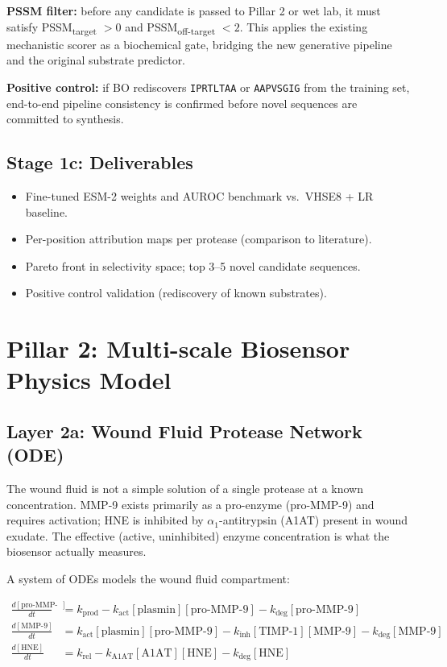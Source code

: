 \documentclass[10pt,a4paper]{article}
\newcommand{\seq}[1]{\texttt{#1}}
\begin{document}
\textbf{PSSM filter:} before any candidate is passed to Pillar 2 or wet
lab, it must satisfy PSSM\textsubscript{target} $>0$ and
PSSM\textsubscript{off-target} $<2$.  This applies the existing
mechanistic scorer as a biochemical gate, bridging the new generative
pipeline and the original substrate predictor.

\textbf{Positive control:} if BO rediscovers \seq{IPRTLTAA} or
\seq{AAPVSGIG} from the training set, end-to-end pipeline consistency
is confirmed before novel sequences are committed to synthesis.

\subsection{Stage 1c: Deliverables}

\begin{itemize}[topsep=2pt,itemsep=1pt,leftmargin=*]
  \item Fine-tuned ESM-2 weights and AUROC benchmark vs.\ VHSE8 + LR baseline.
  \item Per-position attribution maps per protease (comparison to literature).
  \item Pareto front in selectivity space; top 3--5 novel candidate sequences.
  \item Positive control validation (rediscovery of known substrates).
\end{itemize}

\section{Pillar 2: Multi-scale Biosensor Physics Model}

\subsection{Layer 2a: Wound Fluid Protease Network (ODE)}

The wound fluid is not a simple solution of a single protease at a known
concentration.  MMP-9 exists primarily as a pro-enzyme (pro-MMP-9) and
requires activation; HNE is inhibited by $\alpha_1$-antitrypsin (A1AT)
present in wound exudate.  The effective (active, uninhibited) enzyme
concentration is what the biosensor actually measures.

A system of ODEs models the wound fluid compartment:

\begin{align}
  \frac{d[\text{pro-MMP-9}]}{dt} &= k_\text{prod} - k_\text{act}[\text{plasmin}][\text{pro-MMP-9}] - k_\text{deg}[\text{pro-MMP-9}]\\[4pt]
  \frac{d[\text{MMP-9}]}{dt}     &= k_\text{act}[\text{plasmin}][\text{pro-MMP-9}] - k_\text{inh}[\text{TIMP-1}][\text{MMP-9}] - k_\text{deg}[\text{MMP-9}]\\[4pt]
  \frac{d[\text{HNE}]}{dt}       &= k_\text{rel} - k_\text{A1AT}[\text{A1AT}][\text{HNE}] - k_\text{deg}[\text{HNE}]
\end{align}
\end{document}
